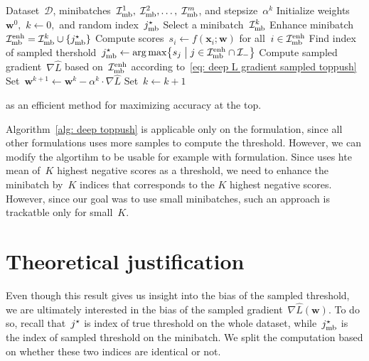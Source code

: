 \begin{algorithm}[H]
  \centering
  \begin{algorithmic}[1]
    \Require Dataset~$\mathcal{D}$, minibatches~$\mathcal{I}_{\text{mb}}^1,\; \mathcal{I}_{\text{mb}}^2, \ldots, \; \mathcal{I}_{\text{mb}}^m$, and stepsize~$\alpha^k$
    \State Initialize weights~$\bm{w}^0,$ $k \gets 0,$ and random index~$j^{\star}_{\text{mb}}$
    \Repeat
    \State Select a minibatch~$\mathcal{I}_{\text{mb}}^k$
    \State Enhance minibatch~$\Imb^{\text{enh}} = \Imb^k \cup \Brac[c]{\indmaxmb}$
    \State Compute scores~$s_i \gets f(\bm{x}_i; \bm{w})$ for all~$i \in \mathcal{I}_{\text{mb}}^{\text{enh}}$
    \State Find index of sampled thershold~$\indmaxmb \gets \argmax \Set{s_j}{j \in \Imb^{\text{enh}} \cap \Ineg}$
    \State Compute sampled gradient~$\nabla \hat{L}$ based on~$\mathcal{I}_{\text{mb}}^{\text{enh}}$ according to~\eqref{eq: deep L gradient sampled toppush}
    \State Set~$\bm{w}^{k+1} \gets \bm{w}^k - \alpha^k \cdot \nabla \hat{L}$
    \State Set~$k \gets k + 1$
  \end{algorithmic}
  \caption{\DeepTopPush as an efficient method for maximizing accuracy at the top.}
  \label{alg: deep toppush}
\end{algorithm}

\begin{note}\label{note: deep extension}
  Algorithm~\ref{alg: deep toppush} is applicable only on the \TopPush formulation, since all other formulations uses more samples to compute the threshold. However, we can modify the algortihm to be usable for example with \TopPushK formulation. Since \TopPushK uses hte mean of~$K$ highest negative scores as a threshold, we need to enhance the minibatch by~$K$ indices that corresponds to the $K$ highest negative scores. However, since our goal was to use small minibatches, such an approach is trackatble only for small~$K.$ 
\end{note}

\section{Theoretical justification}

Even though this result gives us insight into the bias of the sampled threshold, we are ultimately interested in the bias of the sampled gradient~$\nabla \hat{L}(\bm{w})$. To do so, recall that~$j^{\star}$ is index of true threshold on the whole dataset, while~$j^{\star}_{\text{mb}}$ is the index of sampled threshold on the minibatch. We split the computation based on whether these two indices are identical or not.

